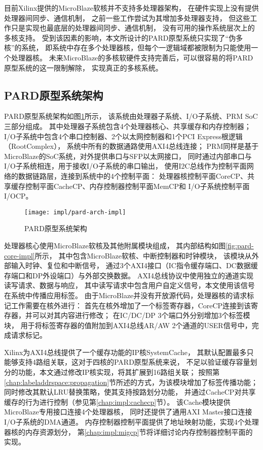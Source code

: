 目前Xilinx提供的MicroBlaze软核并不支持多处理器架构，
在硬件实现上没有提供处理器间同步、通信机制，
之前一些工作\cite{microblaze-mp-rsp08,microblaze-mp-xapp}尝试为其增加多处理器支持，
但这些工作只是实现也最底层的处理器间同步、通信机制，
没有可用的操作系统层次上的多核支持。
受到该因素的影响，本文所设计的PARD原型系统只实现了``伪多核''的系统，
即系统中存在多个处理器核，但每个一逻辑域都被限制为只能使用一个处理器核。
未来MicroBlaze的多核软硬件支持完善后，可以很容易的将PARD原型系统的这一限制解除，
实现真正的多核系统。


\subsection{PARD原型系统架构}

PARD原型系统架构如图\ref{fig:pard-arch-impl}所示，
该系统由处理器子系统、I/O子系统、PRM SoC三部分组成。
其中处理器子系统包含4个处理器核心、共享缓存和内存控制器；
I/O子系统中包含4个串口控制器、2个以太网控制器和1个PCI Express根逻辑（RootComplex），
系统中所有的数据通路使用AXI4总线连接；
PRM同样是基于MicroBlaze的SoC系统，对外提供串口与SFP以太网接口，
同时通过内部串口与I/O子系统相连，用于接收I/O子系统的串口输出，
使用I2C总线作为控制平面网络的数据链路层，连接到系统中的4个控制平面：
处理器核控制平面CoreCP、共享缓存控制平面CacheCP、内存控制器控制平面MemCP和
I/O子系统控制平面I/OCP。

\begin{figure}[tb]
  \centering
  \texttt{[image: impl/pard-arch-impl]}
  \caption{PARD原型系统架构}
  \label{fig:pard-arch-impl}
\end{figure}

处理器核心使用MicroBlaze软核及其他附属模块组成，
其内部结构如图\ref{fig:pard-core-impl}所示，
其中包含MicroBlaze软核、中断控制器和时钟模块，
该模块从外部输入时钟、复位和中断信号，
通过3个AXI4接口（IC指令缓存端口、DC数据缓存端口和DP外设端口）与外部交换数据。
AXI4总线协议中使用独立的通道实现读写请求、数据与响应，
其中读写请求中包含用户自定义信号，本文使用该信号在系统中传播应用标签。
由于MicroBlaze并没有开放源代码，处理器核的请求标记工作需要在核外进行：
首先在核外增加了一个标签寄存器，CoreCP连接到该寄存器，并可以对其内容进行修改；
在IC/DC/DP 3个端口外分别增加3个标签模块，
用于将标签寄存器的值附加到AXI4总线AR/AW 2个通道的USER信号中，完成请求标记。

Xilinx为AXI4总线提供了一个缓存功能的IP核SystemCache\cite{pg118-system-cache}，
其默认配置最多只能够支持4路组关联，这对于四核的PARD原型系统来说，
不足以验证缓存容量划分的功能，本文通过修改IP核实现，将其扩展到16路组关联；
按照第\ref{chap:labeladdrspace:propagation}节所述的方式，为该模块增加了标签传播功能；
同时修改其默认LRU替换策略，使其支持按路划分功能，
并通过CacheCP对共享缓存的行为进行控制（参见第\ref{chap:impl:cachecp}节）。
该Cache模块提供MicroBlaze专用接口连接4个处理器核，
同时还提供了通用AXI Master接口连接I/O子系统的DMA通道。
内存控制器控制平面提供了地址映射功能，实现4个处理器核的内存资源划分，
第\ref{chap:impl:migcp}节将详细讨论内存控制器控制平面的实现。

